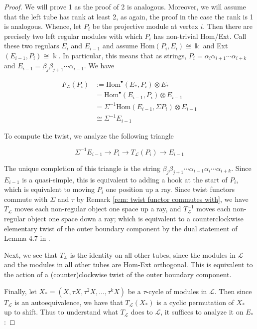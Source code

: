 \documentclass[12pt]{amsart}
\theoremstyle{plain}
\theoremstyle{definition}
\theoremstyle{remark}
\begin{document}
\begin{proof}
We will prove 1 as the proof of 2 is analogous. Moreover, we will assume that the left tube has rank at least 2, as again, the proof in the case the rank is 1 is analogous. Whence, let $P_i$ be the projective module at vertex $i$. Then there are precisely two left regular modules with which $P_i$ has non-trivial Hom/Ext. Call these two regulars $E_i$ and $E_{i-1}$ and assume Hom$(P_i,E_i)\cong \Bbbk$ and Ext$(E_{i-1},P_i)\cong \Bbbk$. In particular, this means that as strings, $P_i = \alpha_i\alpha_{i+1}\cdots\alpha_{i+k}$ and $E_{i-1} = \beta_j\beta_{j+1}\cdots\alpha_{i-1}$. We have 

\begin{align*}
F_{\mathscr{L}}(P_i) &:= \text{Hom}^{\bullet}(E_*,P_i)\otimes E_* \\
&= \text{Hom}^{\bullet}(E_{i-1},P_i) \otimes E_{i-1} \\
&= \Sigma^{-1}\text{Hom}(E_{i-1},\Sigma P_i) \otimes E_{i-1} \\
&\cong \Sigma^{-1}E_{i-1}
\end{align*}

To compute the twist, we analyze the following triangle

$$\Sigma^{-1} E_{i-1} \rightarrow P_i \rightarrow T_{\mathscr{L}}(P_i) \rightarrow E_{i-1}$$

The unique completion of this triangle is the string $\beta_j\beta_{j+1}\cdots\alpha_{i-1}\alpha_i\cdots\alpha_{i+k}$. Since $E_{i-1}$ is a quasi-simple, this is equivalent to adding a hook at the start of $P_i$, which is equivalent to moving $P_i$ one position up a ray. Since twist functors commute with $\Sigma$ and $\tau$ by Remark \ref{rem: twist functor commutes with}, we have $T_{\mathscr{L}}$ moves each non-regular object one space {\color{black} up a ray}, and $T^{-1}_{\mathscr{L}}$ moves each non-regular object one space {\color{black} down a ray}; which is equivalent to a counterclockwise elementary twist of the outer boundary component by the dual statement of Lemma 4.7 in \cite{maresca2022combinatorics}.

Next, we see that $T_{\mathscr{L}}$ is the identity on all other tubes, since the modules in $\mathscr{L}$ and the modules in all other tubes are Hom-Ext orthogonal. This is equivalent to the action of a (counter)clockwise twist of the outer boundary component. 

Finally, let $X_*= (X, \tau X, \tau^2 X, \dots, \tau^k X)$ be a $\tau$-cycle of modules in $\mathscr{L}$. Then since $T_{\mathscr{L}}$ is an autoequivalence, we have that $T_{\mathscr{L}}(X_*)$ is a cyclic permutation of $X_*$ up to shift. Thus to understand what $T_{\mathscr{L}}$ does to $\mathscr{L}$, it suffices to analyze it on $E_*$:


\end{proof}
\end{document}
